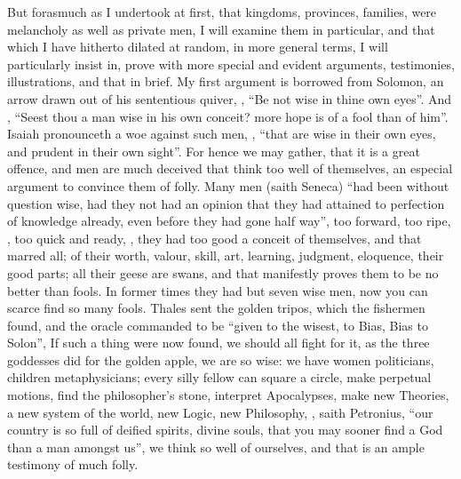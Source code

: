But forasmuch as I undertook at first, that kingdoms, provinces, families, were
melancholy as well as private men, I will examine them in particular, and that
which I have hitherto dilated at random, in more general terms, I will
particularly insist in, prove with more special and evident arguments,
testimonies, illustrations, and that in brief.  My first argument is borrowed from
Solomon, an arrow drawn out of his sententious quiver, , \enquote{Be not wise in thine own eyes}. And , \enquote{Seest thou a man
wise in his own conceit? more hope is of a fool than of him}. Isaiah
pronounceth a woe against such men, , \enquote{that are wise
in their own eyes, and prudent in their own sight}. For hence we may gather,
that it is a great offence, and men are much deceived that think too well of
themselves, an especial argument to convince them of folly. Many men (saith
Seneca) \enquote{had been without question wise, had they not had
an opinion that they had attained to perfection of knowledge already, even
before they had gone half way}, too forward, too ripe, , too
quick and ready, , they had
too good a conceit of themselves, and that marred all; of their worth, valour,
skill, art, learning, judgment, eloquence, their good parts; all their geese
are swans, and that manifestly proves them to be no better than fools. In
former times they had but seven wise men, now you can scarce find so many
fools. Thales sent the golden tripos, which the fishermen found, and the oracle
commanded to be \enquote{given to the wisest, to Bias, Bias to
Solon}, \etc{} If such a thing were now found, we should all fight for it, as
the three goddesses did for the golden apple, we are so wise: we have women
politicians, children metaphysicians; every silly fellow can square a circle,
make perpetual motions, find the philosopher's stone, interpret Apocalypses,
make new Theories, a new system of the world, new Logic, new Philosophy, \etc{}
, saith Petronius, \enquote{our country is
so full of deified spirits, divine souls, that you may sooner find a God than a
man amongst us}, we think so well of ourselves, and that is an ample testimony
of much folly.

